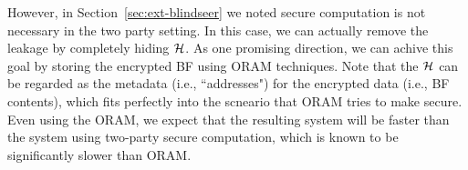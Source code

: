 However, in
Section~\ref{sec:ext-blindseer} we noted secure computation is not necessary in the two party setting. In this case, we can actually remove the
leakage by completely hiding ${\cal H}$. As one promising direction, we can achive
this goal by storing the encrypted BF using ORAM techniques. Note that the
${\cal H}$ can be regarded as the metadata (i.e., ``addresses") for the encrypted
data (i.e., BF contents), which fits perfectly into the scneario that ORAM
tries to make secure. 
%
Even using the ORAM, we expect that the resulting system will be faster than
the system using two-party secure computation, which is known to be
significantly slower than ORAM. 


